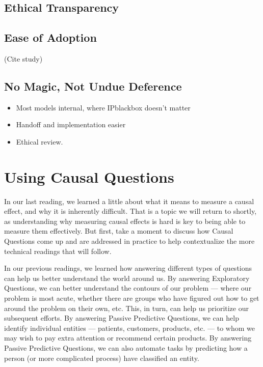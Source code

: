 \documentclass[letterpaper,10pt,english]{jupyterBook}
\begin{document}
\section{Ethical Transparency}
\label{\detokenize{30_questions/32_passive_interpretable_models:ethical-transparency}}

\section{Ease of Adoption}
\label{\detokenize{30_questions/32_passive_interpretable_models:ease-of-adoption}}
\sphinxAtStartPar
(Cite study)


\section{No Magic, Not Undue Deference}
\label{\detokenize{30_questions/32_passive_interpretable_models:no-magic-not-undue-deference}}\begin{itemize}
\item {} 
\sphinxAtStartPar
Most models internal, where IP\sphinxhyphen{}black\sphinxhyphen{}box doesn’t matter

\item {} 
\sphinxAtStartPar
Handoff and implementation easier

\item {} 
\sphinxAtStartPar
Ethical review.

\end{itemize}

\sphinxstepscope


\chapter{Using Causal Questions}
\label{\detokenize{30_questions/35_using_causal_questions:using-causal-questions}}\label{\detokenize{30_questions/35_using_causal_questions::doc}}
\sphinxAtStartPar
In our last reading, we learned a little about what it means to measure a causal effect, and why it is inherently difficult. That is a topic we will return to shortly, as understanding why measuring causal effects is hard is key to being able to measure them effectively. But first, take a moment to discuss how Causal Questions come up and are addressed in practice to help contextualize the more technical readings that will follow.

\sphinxAtStartPar
In our previous readings, we learned how answering different types of questions can help us better understand the world around us. By answering Exploratory Questions, we can better understand the contours of our problem — where our problem is most acute, whether there are groups who have figured out how to get around the problem on their own, etc. This, in turn, can help us prioritize our subsequent efforts. By answering Passive Predictive Questions, we can help identify individual entities — patients, customers, products, etc. — to whom we may wish to pay extra attention or recommend certain products. By answering Passive Predictive Questions, we can also automate tasks by predicting how a person (or more complicated process)  have classified an entity.
\end{document}
